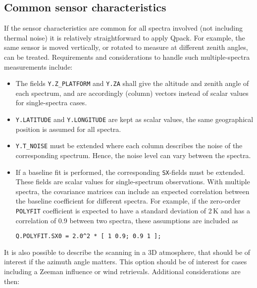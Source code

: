 \documentclass[a4paper,11pt]{article}
\begin{document}
\subsection{Common sensor characteristics}
%
If the sensor characteristics are common for all spectra involved (not
including thermal noise) it is relatively straightforward to apply Qpack. For
example, the same sensor is moved vertically, or rotated to measure at
different zenith angles, can be treated. Requirements and considerations to
handle such multiple-spectra measurements include:
\begin{itemize}
\item The fields \verb|Y.Z_PLATFORM| and \verb|Y.ZA| shall give the altitude
  and zenith angle of each spectrum, and are accordingly (column) vectors
  instead of scalar values for single-spectra cases. 
\item \verb|Y.LATITUDE| and \verb|Y.LONGITUDE| are kept as scalar values, the
  same geographical position is assumed for all spectra.
\item \verb|Y.T_NOISE| must be extended where each column describes the noise
  of the corresponding spectrum. Hence, the noise level can vary between the
  spectra.
\item If a baseline fit is performed, the corresponding \verb|SX|-fields must
  be extended. These fields are scalar values for single-spectrum
  observations. With multiple spectra, the covariance matrices can include an
  expected correlation between the baseline coefficient for different spectra.
  For example, if the zero-order \verb|POLYFIT| coefficient is expected to have
  a standard deviation of 2\,K and has a correlation of 0.9 between two
  spectra, these assumptions are included as
\begin{verbatim}
Q.POLYFIT.SX0 = 2.0^2 * [ 1 0.9; 0.9 1 ];
\end{verbatim}
\end{itemize}
It is also possible to describe the scanning in a 3D atmosphere, that should be
of interest if the azimuth angle matters. This option should be of interest for
cases including a Zeeman influence or wind retrievals. Additional
considerations are then:
\end{document}
